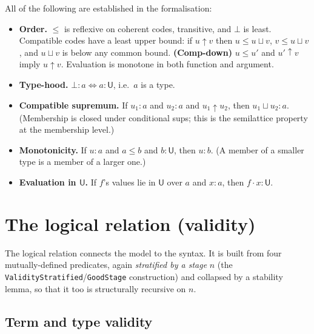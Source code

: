 \documentclass[11pt]{article}
\newcommand{\U}{\mathsf{U}}
\newcommand{\Bot}{\bot}
\newcommand{\ev}[2]{#1\!\cdot\!#2}      %
\newcommand{\comp}{\mathbin{\uparrow}}  %
\theoremstyle{plain}
\theoremstyle{definition}
\begin{document}
All of the following are established in the formalisation:
\begin{itemize}
  \item \textbf{Order.} $\leq$ is reflexive on coherent codes, transitive, and
    $\Bot$ is least.  Compatible codes have a least upper bound: if $u\comp v$
    then $u\leq u\sqcup v$, $v\leq u\sqcup v$, and $u\sqcup v$ is below any
    common bound.  \textbf{(Comp-down)} $u\leq u'$ and $u'\comp v$ imply
    $u\comp v$.  Evaluation is monotone in both function and argument.
  \item \textbf{Type-hood.} $\Bot : a \iff a : \U$, i.e.\ $a$ is a type.
  \item \textbf{Compatible supremum.} If $u_1 : a$ and $u_2 : a$ and
    $u_1 \comp u_2$, then $u_1 \sqcup u_2 : a$.  (Membership is closed under
    conditional sups; this is the semilattice property at the membership
    level.)
  \item \textbf{Monotonicity.} If $u : a$ and $a \leq b$ and $b : \U$, then
    $u : b$.  (A member of a smaller type is a member of a larger one.)
  \item \textbf{Evaluation in $\U$.} If $f$'s values lie in $\U$ over $a$ and
    $x : a$, then $\ev f x : \U$.
\end{itemize}

\section{The logical relation (validity)}

The logical relation connects the model to the syntax.  It is built from four
mutually-defined predicates, again \emph{stratified by a stage} $n$ (the
\texttt{ValidityStratified}/\texttt{GoodStage} construction) and collapsed by a
stability lemma, so that it too is structurally recursive on $n$.

\subsection{Term and type validity}
\end{document}
